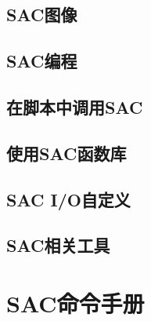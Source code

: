 \documentclass[a4paper, 11pt, twoside]{book}
\begin{document}
\chapter{SAC图像}
\label{chap:sac-graphics}







\chapter{SAC编程}
\label{chap:sac-programming}






\chapter{在脚本中调用SAC}
\label{chap:sac-script}



\chapter{使用SAC函数库}
\label{chap:sac-libs}




\chapter{SAC I/O自定义}
\label{chap:sac-custom-io}


\chapter{SAC相关工具}





\part{SAC命令手册}
\end{document}
